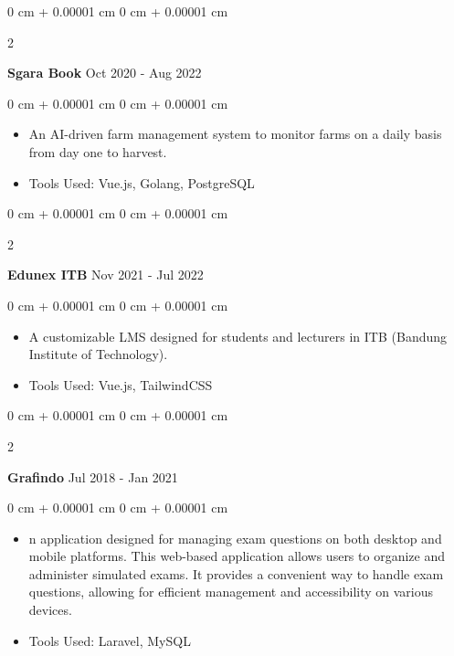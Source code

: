 \documentclass[10pt, letterpaper]{article}
\newenvironment{highlights}{
    \begin{itemize}[
        topsep=0.10 cm,
        parsep=0.10 cm,
        partopsep=0pt,
        itemsep=0pt,
        leftmargin=0 cm + 10pt
    ]
}{
    \end{itemize}
} %
\newenvironment{onecolentry}{
    \begin{adjustwidth}{
        0 cm + 0.00001 cm
    }{
        0 cm + 0.00001 cm
    }
}{
    \end{adjustwidth}
} %
\newenvironment{twocolentry}[2][]{
    \onecolentry
    \def\secondColumn{#2}
    \setcolumnwidth{\fill, 4.5 cm}
    \begin{paracol}{2}
}{
    \switchcolumn \raggedleft \secondColumn
    \end{paracol}
    \endonecolentry
} %
\begin{document}
        \vspace{0.2 cm}

        \begin{twocolentry}{
            Oct 2020 - Aug 2022
        }
            \textbf{Sgara Book}\end{twocolentry}

        \vspace{0.10 cm}
        \begin{onecolentry}
            \begin{highlights}
                \item An AI-driven farm management system to monitor farms on a daily basis from day one to harvest.
                \item Tools Used: Vue.js, Golang, PostgreSQL
            \end{highlights}
        \end{onecolentry}


        \vspace{0.2 cm}

        \begin{twocolentry}{
            Nov 2021 - Jul 2022
        }
            \textbf{Edunex ITB}\end{twocolentry}

        \vspace{0.10 cm}
        \begin{onecolentry}
            \begin{highlights}
                \item A customizable LMS designed for students and lecturers in ITB (Bandung Institute of Technology).
                \item Tools Used: Vue.js, TailwindCSS
            \end{highlights}
        \end{onecolentry}


        \vspace{0.2 cm}

        \begin{twocolentry}{
            Jul 2018 - Jan 2021
        }
            \textbf{Grafindo}\end{twocolentry}

        \vspace{0.10 cm}
        \begin{onecolentry}
            \begin{highlights}
                \item n application designed for managing exam questions on both desktop and mobile platforms. This web-based application allows users to organize and administer simulated exams. It provides a convenient way to handle exam questions, allowing for efficient management and accessibility on various devices.
                \item Tools Used: Laravel, MySQL
            \end{highlights}
        \end{onecolentry}
\end{document}
